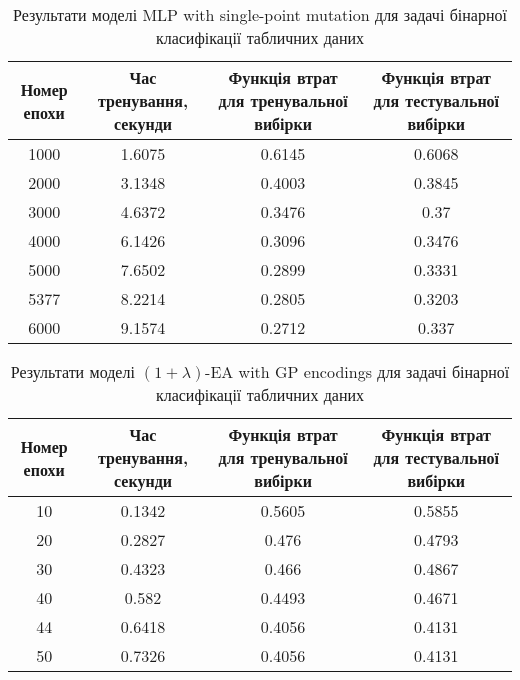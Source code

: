 \begin{table}[ht]
	\centering
	\begin{adjustbox}{max width=\textwidth}
		\begin{tabular}{|c|c|c|c|}
			\hline 
			Номер епохи & Час тренування, секунди & Функція втрат для тренувальної вибірки & Функція втрат для тестувальної вибірки \\
			\hline 
			1000 & 1.6075 & 0.6145 & 0.6068 \\
			\hline 
			2000 & 3.1348 & 0.4003 & 0.3845 \\
			\hline
			3000 & 4.6372 & 0.3476 & 0.37 \\
			\hline
			4000 & 6.1426 & 0.3096 & 0.3476 \\
			\hline
			5000 & 7.6502 & 0.2899 & 0.3331 \\
			\hline
			5377 & 8.2214 & 0.2805 & 0.3203 \\
			\hline
			6000 & 9.1574 & 0.2712 & 0.337 \\
			\hline
		\end{tabular}
	\end{adjustbox}
	\caption{Результати моделі MLP with single-point mutation для задачі бінарної класифікації табличних даних}
	\label{mlp_spm_bc_td_results}
\end{table}

\begin{table}[ht]
	\centering
	\begin{adjustbox}{max width=\textwidth}
		\begin{tabular}{|c|c|c|c|}
			\hline 
			Номер епохи & Час тренування, секунди & Функція втрат для тренувальної вибірки & Функція втрат для тестувальної вибірки \\
			\hline 
			10 & 0.1342 & 0.5605 & 0.5855 \\
			\hline 
			20 & 0.2827 & 0.476 & 0.4793 \\
			\hline
			30 & 0.4323 & 0.466 & 0.4867 \\
			\hline
			40 & 0.582 & 0.4493 & 0.4671 \\
			\hline
			44 & 0.6418 & 0.4056 & 0.4131 \\
			\hline
			50 & 0.7326 & 0.4056 & 0.4131 \\
			\hline
		\end{tabular}
	\end{adjustbox}
	\caption{Результати моделі $(1+\lambda)$-EA with GP encodings для задачі бінарної класифікації табличних даних}
	\label{ea_bc_td_results}
\end{table}

